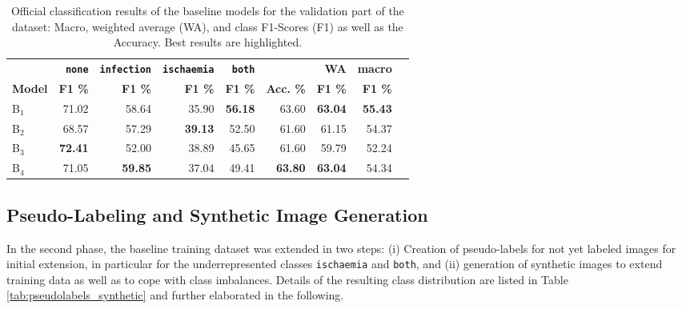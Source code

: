 \documentclass[runningheads]{llncs}
\begin{document}
\begin{table}[ht!]
	\begin{center}
		\caption{Official classification results of the baseline models for the validation part of the dataset: Macro, weighted average (WA), and class F1-Scores (F1) as well as the Accuracy. Best results are highlighted.}\label{tab:ResultsValidation}
		\begin{tabularx}{\textwidth}{|X|r|r|r|r|r|r|r|r|}
			\hline
			\textbf{} & \textbf{\texttt{none}} & \textbf{\texttt{infection}} & \textbf{\texttt{ischaemia}} & \textbf{\texttt{both}}&\textbf{}&\textbf{WA}&\textbf{macro} \\
			\textbf{Model} & \textbf{F1 \%} & \textbf{F1 \%} & \textbf{F1 \%} & \textbf{F1 \%} &\textbf{Acc. \%}&\textbf{F1 \%}& \textbf{F1 \%}\\
			\hline\hline
			B$_1$&71.02&58.64&35.90&\textbf{56.18}&63.60&\textbf{63.04}&\textbf{55.43}\\
			B$_2$&68.57&57.29&\textbf{39.13}&52.50&61.60&61.15&54.37\\
			B$_3$&\textbf{72.41}&52.00&38.89&45.65&61.60&59.79&52.24\\
			B$_4$&71.05&\textbf{59.85}&37.04&49.41&\textbf{63.80}&\textbf{63.04}&54.34\\\hline
		\end{tabularx}
	\end{center}
\end{table}

\subsection{Pseudo-Labeling and Synthetic Image Generation} %

In the second phase, the baseline training dataset was extended in two steps: (i) Creation of pseudo-labels for not yet labeled images for initial extension, in particular for the underrepresented classes \texttt{ischaemia} and \texttt{both}, and (ii) generation of synthetic images to extend training data as well as to cope with class imbalances. Details of the resulting class distribution are listed in Table \ref{tab:pseudolabels_synthetic} and further elaborated in the following.
\end{document}
